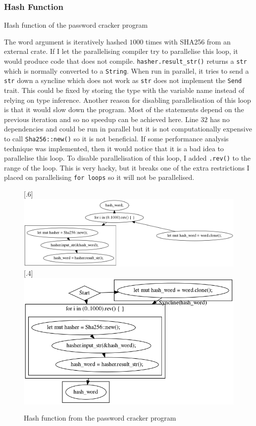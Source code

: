 \subsubsection{Hash Function}
\begin{code}
    \caption{Hash function of the password cracker program}
\end{code}

The word argument is iteratively hashed $1000$ times with SHA256 from an external crate. If I let the parallelising compiler try to parallelise this loop, it would produce code that does not compile.
\texttt{hasher.result\_str()} returns a \texttt{str} which is normally converted to a \texttt{String}. When run in parallel, it tries to send a \texttt{str} down a syncline which does not work as \texttt{str} does not implement the \texttt{Send} trait.
This could be fixed by storing the type with the variable name instead of relying on type inference. Another reason for disabling parallelisation of this loop is that it would slow down the program. Most of the statements depend on the previous iteration and so no speedup can be achieved here. Line $32$ has no dependencies and could be run in parallel but it is not computationally expensive to call \texttt{Sha256::new()} so it is not beneficial. If some performance analysis technique was implemented, then it would notice that it is a bad idea to parallelise this loop.
To disable parallelisation of this loop, I added \texttt{.rev()} to the range of the loop. This is very hacky, but it breaks one of the extra restrictions I placed on parallelising \texttt{for loops} so it will not be parallelised.

\begin{figure}
    [.6\textwidth]{\includegraphics[width=.6\textwidth]{img/password-cracker/hash-dependency-analysis.png}}
    [.4\textwidth]{\includegraphics[width=.4\textwidth]{img/password-cracker/hash-schedule.png}}
    \caption{Hash function from the password cracker program}
\end{figure}

